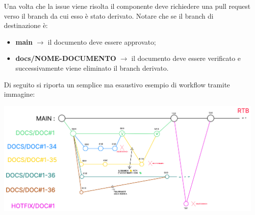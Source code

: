          
        Una volta che la issue viene risolta il componente deve richiedere una pull request
        verso il branch da cui esso è stato derivato.
        Notare che se il branch di destinazione è:
        \begin{itemize}
            \item \textbf{main} $\rightarrow$ il documento deve essere approvato;
            \item \textbf{docs/NOME-DOCUMENTO} $\rightarrow$ il documento deve essere verificato e successivamente viene eliminato il branch derivato.
        \end{itemize}

        Di seguito si riporta un semplice ma esaustivo esempio di workflow tramite immagine:
        \begin{center}
            \includegraphics[scale = 0.33]{template/images/workflow.png}
        \end{center}

